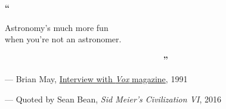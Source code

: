 \vspace{3cm}

\begin{center}
    \begin{Huge}
        \textbf{\textcolor{GOTOlightblue}{``~~~~~~~~~~~~~~~~~~~~~~~~~~~~~}} \\
    \end{Huge}
    \begin{LARGE}
        \vspace{-\baselineskip}
        Astronomy's much more fun \\
        when you're not an astronomer. \\
        \vspace{-\baselineskip}
    \end{LARGE}
    \begin{Huge}
        \textbf{\textcolor{GOTOlightblue}{~~~~~~~~~~~~~~~~~~~~~~~~~~~~~~~~~''}} \\
    \end{Huge}
\end{center}

\begin{small}
    \hspace{4cm} --- Brian May, {\hypersetup{urlcolor=black}\href{https://brianmay.com/brian/magsandpress/voxmar91/voxmar91.html}{Interview with \textit{Vox} magazine}}, 1991

    \vspace{0.2cm}
    \hspace{4cm} --- Quoted by Sean Bean, \textit{Sid Meier's Civilization VI}, 2016
\end{small}

